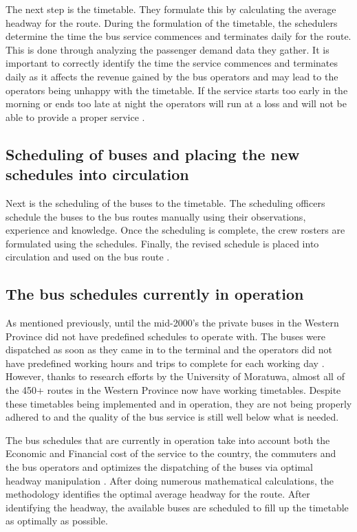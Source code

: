 The next step is the timetable. They formulate this by calculating the average headway for the route. During the formulation of the timetable, the schedulers determine the time the bus service commences and terminates daily for the route. This is done through analyzing the passenger demand data they gather. It is important to correctly identify the time the service commences and terminates daily as it affects the revenue gained by the bus operators and may lead to the operators being unhappy with the timetable. If the service starts too early in the morning or ends too late at night the operators will run at a loss and will not be able to provide a proper service \cite{Mahesh2013a, Theja2013a, Mahesh2013b, Navaratne2013a, Navaratne2013b}.

\subsection{Scheduling of buses and placing the new schedules into circulation}

Next is the scheduling of the buses to the timetable. The scheduling officers schedule the buses to the bus routes manually using their observations, experience and knowledge. Once the scheduling is complete, the crew rosters are formulated using the schedules. Finally, the revised schedule is placed into circulation and used on the bus route \cite{Mahesh2013a, Theja2013a, Mahesh2013b, Navaratne2013a, Navaratne2013b}.

\subsection{The bus schedules currently in operation}

As mentioned previously, until the mid-2000's the private buses in the Western Province did not have predefined schedules to operate with. The buses were dispatched as soon as they came in to the terminal and the operators did not have predefined working hours and trips to complete for each working day \cite{Piyadasa2005}. However, thanks to research efforts by the University of Moratuwa, almost all of the 450+ routes in the Western Province now have working timetables. Despite these timetables being implemented and in operation, they are not being properly adhered to and the quality of the bus service is still well below what is needed.

The bus schedules that are currently in operation take into account both the Economic and Financial cost of the service to the country, the commuters and the bus operators and optimizes the dispatching of the buses via optimal headway manipulation \cite{Piyadasa2005}. After doing numerous mathematical calculations, the methodology identifies the optimal average headway for the route. After identifying the headway, the available buses are scheduled to fill up the timetable as optimally as possible.

